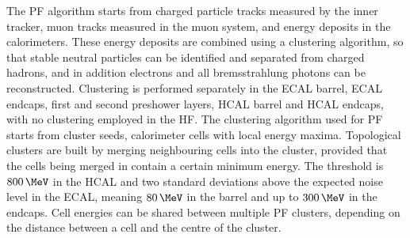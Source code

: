 The \ac{PF} algorithm starts from charged particle tracks measured
by the inner tracker, muon tracks measured in the muon system, and 
energy deposits in the calorimeters. These energy deposits are combined
using a clustering algorithm, so that stable neutral particles can be identified and
separated from charged hadrons, and in addition electrons and all bremsstrahlung photons
can be reconstructed. Clustering is performed separately in the \ac{ECAL} barrel,
\ac{ECAL} endcaps, first and second preshower layers, \ac{HCAL} barrel and \ac{HCAL} endcaps, with no 
clustering employed in the \ac{HF}.
The clustering algorithm used for \ac{PF} starts from cluster seeds,
calorimeter cells with local energy maxima. Topological clusters are built by 
merging neighbouring cells into the cluster, provided that the cells
being merged in contain a certain minimum energy.
The threshold is $800\,\MeV$ in the \ac{HCAL} and two standard deviations above the
expected noise level in the \ac{ECAL}, meaning $80\,\MeV$ in the barrel and up 
to $300\,\MeV$ in the endcaps. Cell energies can be shared between multiple
\ac{PF} clusters, depending on the distance between a cell and the centre of the cluster.

